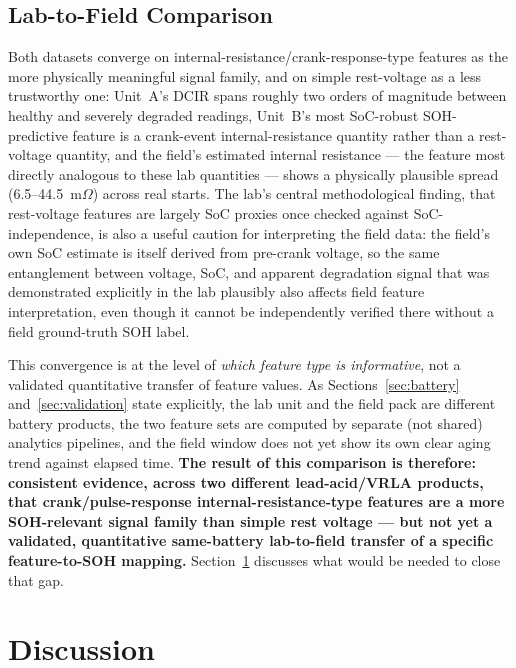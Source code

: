\documentclass[conference]{IEEEtran}
\begin{document}
\subsection{Lab-to-Field Comparison}
\label{sec:results-comparison}

Both datasets converge on internal-resistance/crank-response-type features as the more physically meaningful signal family, and on simple rest-voltage as a less trustworthy one: Unit~A's DCIR spans roughly two orders of magnitude between healthy and severely degraded readings, Unit~B's most SoC-robust SOH-predictive feature is a crank-event internal-resistance quantity rather than a rest-voltage quantity, and the field's estimated internal resistance --- the feature most directly analogous to these lab quantities --- shows a physically plausible spread (6.5--44.5~m$\Omega$) across real starts. The lab's central methodological finding, that rest-voltage features are largely SoC proxies once checked against SoC-independence, is also a useful caution for interpreting the field data: the field's own SoC estimate is itself derived from pre-crank voltage, so the same entanglement between voltage, SoC, and apparent degradation signal that was demonstrated explicitly in the lab plausibly also affects field feature interpretation, even though it cannot be independently verified there without a field ground-truth SOH label.

This convergence is at the level of \emph{which feature type is informative}, not a validated quantitative transfer of feature values. As Sections~\ref{sec:battery} and~\ref{sec:validation} state explicitly, the lab unit and the field pack are different battery products, the two feature sets are computed by separate (not shared) analytics pipelines, and the field window does not yet show its own clear aging trend against elapsed time. \textbf{The result of this comparison is therefore: consistent evidence, across two different lead-acid/VRLA products, that crank/pulse-response internal-resistance-type features are a more SOH-relevant signal family than simple rest voltage --- but not yet a validated, quantitative same-battery lab-to-field transfer of a specific feature-to-SOH mapping.} Section~\ref{sec:discussion} discusses what would be needed to close that gap.

\section{Discussion}
\label{sec:discussion}
\end{document}

